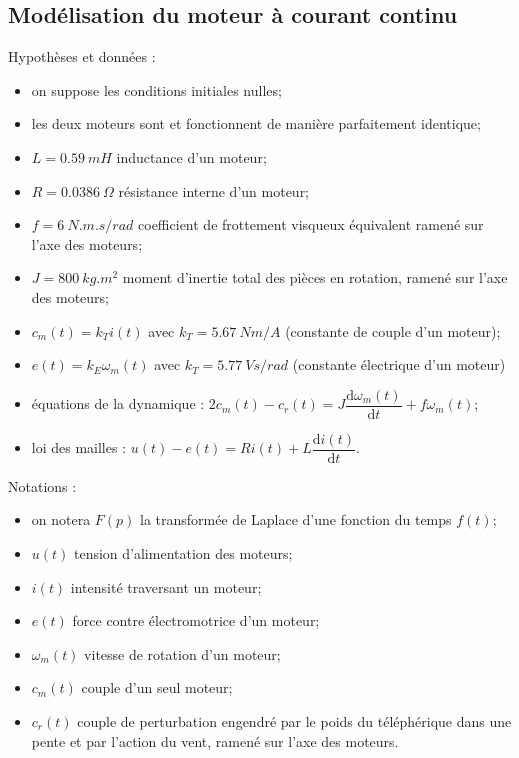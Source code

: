 \documentclass[10pt,fleqn]{article} %
\begin{document}
\begin{multicols}{2}


\subsection*{Modélisation du moteur à courant continu}

Hypothèses et données :
\begin{itemize}
\item on suppose les conditions initiales nulles;
\item les deux moteurs sont et fonctionnent de manière parfaitement identique;
\item $L=\SI{0,59}{mH}$ inductance d’un moteur;
\item $R=\SI{0,0386}{\Omega}$ résistance interne d’un moteur;
\item $f=\SI{6}{N.m.s/rad}$ coefficient de frottement visqueux équivalent ramené sur l’axe des moteurs;
\item $J=\SI{800}{kg.m^2}$ moment d’inertie total des pièces en rotation, ramené sur l’axe des moteurs; 
\item $c_m(t)=k_Ti(t)$ avec $k_T=\SI{5.67}{Nm/A}$ (constante de couple d’un moteur);
\item $e(t)=k_E\omega_m(t)$ avec $k_T=\SI{5.77}{Vs/rad}$   (constante électrique d’un moteur)
\item équations de la dynamique : $2c_m(t)-c_r(t)=J\dfrac{\text{d}\omega_m(t)}{{\text{d}}t}+f\omega_m(t)$;
\item loi des mailles : $u(t)-e(t)=Ri(t)+L\dfrac{\text{d}i(t)}{\text{d}t}$.

\end{itemize}


Notations :

\begin{itemize}
\item on notera $F(p)$ la transformée de Laplace d’une fonction du temps $f(t)$;
\item $u(t)$ tension d’alimentation des moteurs;
\item $i(t)$ intensité traversant un moteur;
\item $e(t)$ force contre électromotrice d’un moteur;
\item $\omega_m(t)$ vitesse de rotation d’un moteur;
\item $c_m(t)$ couple d’un seul moteur;
\item $c_r(t)$ couple de perturbation engendré par le poids du téléphérique dans une pente et par l’action du vent, ramené sur l’axe des moteurs.
\end{itemize}


\end{multicols}
\end{document}
